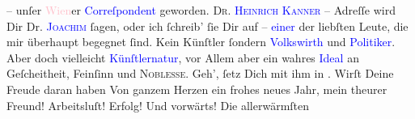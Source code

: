                – unſer \textcolor{pink}{Wien}{}\ledrightnote{\textcolor{pink}{Wien}}er \textcolor{blue}{Correſpondent}{} geworden. \textsc{Dr. \textcolor{blue}{Heinrich Kanner}{}\ledrightnote{\textcolor{blue}{Heinrich Kanner}}} – Adreſſe wird Dir Dr. \textsc{\textcolor{blue}{Joachim}{}\ledrightnote{\textcolor{blue}{Jaques Joachim}}} ſagen, oder ich ſchreib’ ſie Dir auf – \textcolor{blue}{einer}{} der liebſten Leute, die mir überhaupt be{\pb}gegnet ſind. Kein Künſtler ſondern \textcolor{blue}{Volkswirth}{} und \textcolor{blue}{Politiker}{}. Aber doch vielleicht \textcolor{blue}{Künſtlernatur}{}, vor Allem aber
               ein wahres \textcolor{blue}{Ideal}{} an
               Geſcheitheit, Feinſinn und \textsc{Noblesse}. Geh’, ſetz Dich mit
               ihm in \label{K_L02704-10v}\label{K_L02704-10h}. Wirſt
               Deine Freude daran haben{\dotsfive}\pend
           \pstart
           Von ganzem Herzen ein frohes neues Jahr, mein theurer Freund! {\pb}Arbeitsluſt! Erfolg! Und vorwärts! Die allerwärmſten
